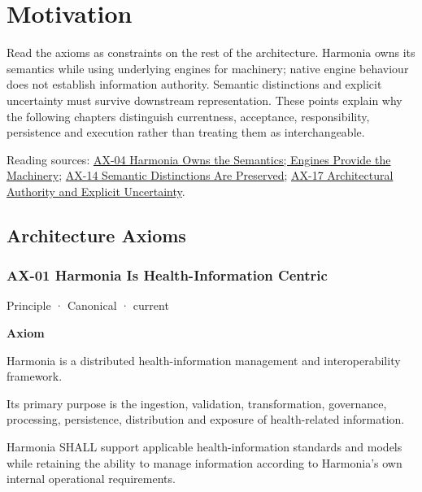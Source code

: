 \part{Motivation}
Read the axioms as constraints on the rest of the architecture. Harmonia owns its semantics while using underlying engines for machinery; native engine behaviour does not establish information authority. Semantic distinctions and explicit uncertainty must survive downstream representation. These points explain why the following chapters distinguish currentness, acceptance, responsibility, persistence and execution rather than treating them as interchangeable.

{\small Reading sources: \hyperref[element:54508cda80484a6caf95b901780eaf7d]{AX-04 Harmonia Owns the Semantics; Engines Provide the Machinery}; \hyperref[element:d3fc6025dc7646d1b2020b51f7a44bfa]{AX-14 Semantic Distinctions Are Preserved}; \hyperref[element:8882573df7ce43c6bc0f66da0a676139]{AX-17 Architectural Authority and Explicit Uncertainty}.}\par
\chapter{Architecture Axioms}

\section{AX-01 Harmonia Is Health-Information Centric}

\label{element:e9bd61acaaea4577bc4086a5639e52c3}
{\small Principle · Canonical · current}\par

\par\medskip\textbf{Axiom}\par


Harmonia is a distributed health-information management and
interoperability framework.



Its primary purpose is the ingestion, validation, transformation,
governance, processing, persistence, distribution and exposure of
health-related information.



Harmonia SHALL support applicable health-information standards and
models while retaining the ability to manage information according to
Harmonia's own internal operational requirements.



